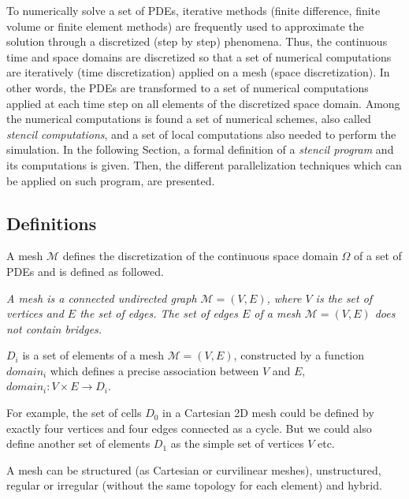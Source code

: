 To numerically solve a set of PDEs, iterative methods (finite difference, finite volume or finite element methods) are frequently used to approximate the solution through a discretized (step by step) phenomena. Thus, the continuous time and space domains are discretized so that a set of numerical computations are iteratively (time discretization) applied on a mesh (space discretization). In other words, the PDEs are transformed to a set of numerical computations applied at each time step on all elements of the discretized space domain. Among the numerical computations is found a set of numerical schemes, also called \textit{stencil computations}, and a set of local computations also needed to perform the simulation.
In the following Section, a formal definition of a \textit{stencil program} and its computations is given. Then, the different parallelization techniques which can be applied on such program, are presented.

\subsection{Definitions}

A mesh $\mathcal{M}$ defines the discretization of the continuous space domain $\Omega$ of a set of PDEs and is defined as followed. 

\begin{mydef}
\textit{A mesh is a connected undirected graph $\mathcal{M}=(V,E)$, where $V$ is the set of vertices and $E$ the set of edges. The set of edges $E$ of a mesh $\mathcal{M}=(V,E)$ does not contain bridges.}
\end{mydef}

\begin{mydef}
$D_i$ is a set of elements of a mesh $\mathcal{M}=(V,E)$, constructed by a function $domain_i$ which defines a precise association between $V$ and $E$, $domain_i : V \times E \rightarrow D_i$.
\end{mydef}
For example, the set of cells $D_0$ in a Cartesian 2D mesh could be defined by exactly four vertices and four edges connected as a cycle. But we could also define another set of elements $D_1$ as the simple set of vertices $V$ etc.

A mesh can be structured (as Cartesian or curvilinear meshes), unstructured, regular or irregular (without the same topology for each element) and hybrid. 


